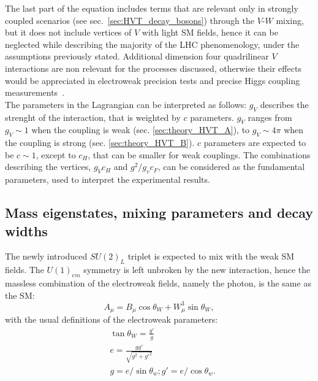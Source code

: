 The last part of the equation includes terms that are relevant only in strongly coupled scenarios (see sec.~\ref{sec:HVT_decay_bosons}) through the $V$-$W$ mixing, but it does not include vertices of $V$ with light SM fields, hence it can be neglected while describing the majority of the LHC phenomenology, under the assumptions previously stated. Additional dimension four quadrilinear $V$ interactions are non relevant for the processes discussed, otherwise their effects would be appreciated in electroweak precision tests and precise Higgs coupling measurements~\cite{Giudice:2007fh}.\\

The parameters in the Lagrangian can be interpreted as follows: $g_V$ describes the strenght of the interaction, that is weighted by $c$ parameters. $g_V$ ranges from $g_V \sim 1$ when the coupling is weak (sec. \ref{sec:theory_HVT_A}), to $g_V \sim 4 \pi$ when the coupling is strong (sec. \ref{sec:theory_HVT_B}). $c$ parameters are expected to be $c \sim 1$, except to $c_H$, that can be smaller for weak couplings. The combinations describing the vertices, $g_V c_H$ and $g^2/g_v c_F$, can be considered as the fundamental parameters, used to interpret the experimental results.

\subsection{Mass eigenstates, mixing parameters and decay widths}
\label{sec:HVT_pheno}

The newly introduced $SU(2)_L$ triplet is expected to mix with the weak SM fields. The $U(1)_{em}$ symmetry is left unbroken by the new interaction, hence the massless combination of the electroweak fields, namely the photon, is the same as the SM:
\begin{equation}
A_{\mu} = B_{\mu} \cos{\theta_W} + W_{\mu}^3 \sin{\theta_W},
\label{eq:A_mu}
\end{equation} 
with the usual definitions of the electroweak parameters:
\begin{equation}
\begin{split}
 & \tan{\theta_W}=\frac{g'}{g} \\
 & e = \frac{g g'}{\sqrt{g^2 + {g'}^2}} \\
 & g = e/\sin{\theta_w}; g' = e/\cos{\theta_w}.
\end{split}
\label{eq:ewk_param}
\end{equation}

